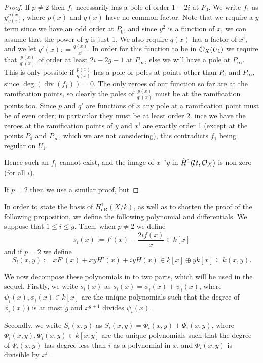 \documentclass[draft, 11pt]{article} %
\theoremstyle{plain}
\theoremstyle{remark}
\newcommand{\cO}{{\cal O}}
\newcommand{\cU}{{\mathcal U}}
\newcommand{\derhamhone}{H_{\text {dR}}^1(X/k)}
\DeclareMathOperator{\di}{div}
\begin{document}
\begin{proof}
If $p \neq 2$ then $f_1$ necessarily has a pole of order $1-2i$ at $P_0$.
We write $f_1$ as $y \frac{p(x)}{q(x)}$, where $p(x)$ and $q(x)$ have no common factor.
Note that we require a $y$ term since we have an odd order at $P_0$, and since $y^2$ is a function of $x$, we can assume that the power of $y$ is just 1.
We also require $q(x)$ has a factor of $x^i$, and we let $q'(x) : = \frac{q(x)}{x^i}$.
In order for this function to be in $\cO_X(U_1)$ we require that $\frac{p(x)}{q'(x)}$ of order at least $2i-2g-1$ at $P_\infty$, else we will have a pole at $P_\infty$.
This is only possible if $\frac{p(x)}{q(x)}$ has a pole or poles at points other than $P_0$ and $P_\infty$, since $\deg(\di(f_1)) = 0$.
The only zeroes of our function so far are at the ramification points, so clearly the poles of $\frac{p(x)}{q'(x)}$ must be at the ramification points too.
Since $p$ and $q'$ are functions of $x$ any pole at a ramification point must be of even order; in particular they must be at least order 2.
ince we have the zeroes at the ramification points of $y$ and $x^i$ are exactly order 1 (except at the points $P_0$ and $P_\infty$, which we are not considering), this contradicts $f_1$ being regular on $U_1$.

Hence such an $f_1$ cannot exist, and the image of $x^{-i}y$ in $\check{H}^1(\cU,\cO_X)$ is non-zero (for all $i$).


If $p=2$ then we use a similar proof, but 
\end{proof}


In order to state the basis of $\derhamhone$, as well as to shorten the proof of the following proposition, we define the following polynomial and differentials. 
We suppose that $1 \leq i \leq g$.
Then, when $p\neq 2$ we define
\[
s_i(x) := f'(x) - \frac{2if(x)}{x} \in k[x]
\]
and if $p = 2$ we define
\begin{equation}\label{capitals}
S_i(x,y) := xF'(x) + xyH'(x) + iyH(x)\in k[x]\oplus yk[x] \subseteq k(x,y).
\end{equation}

We now decompose these polynomials in to two parts, which will be used in the sequel.
Firstly, we write $s_i(x)$ as $s_i(x) = \phi_i(x) + \psi_i(x)$, where $\psi_i(x), \phi_i(x) \in k[x]$ are the unique polynomials such that the degree of $\phi_i (x))$ is at most $g$ and $x^{g+1}$ divides $\psi_i(x)$.



Secondly, we write $S_i(x,y)$ as $S_i(x,y) = \Phi_i(x,y) + \Psi_i(x,y)$, where $\Phi_i(x,y), \Psi_i(x,y) \in k[x,y]$ are the unique polynomials such that the degree of $\Psi_i(x,y)$ has degree less than $i$ as a polynomial in $x$, and $\Phi_i(x,y)$ is divisible by $x^i$.
\end{document}
